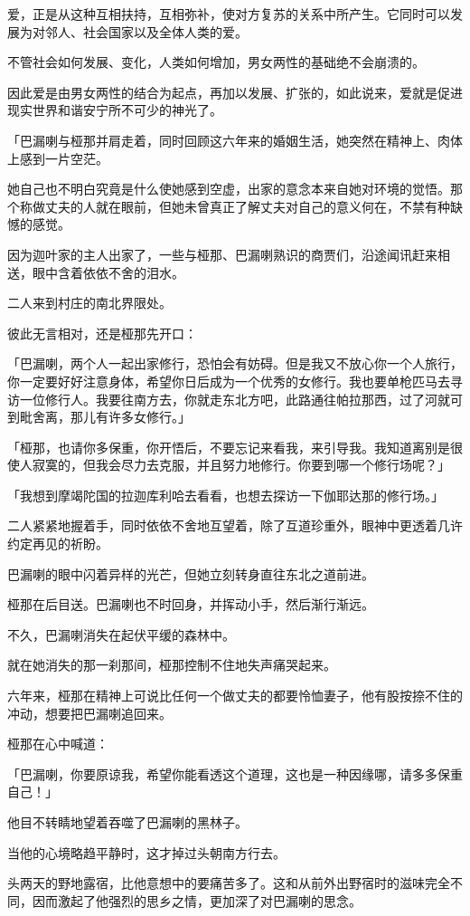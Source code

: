 \documentclass[twoside,openany]{book}
\begin{document}
爱，正是从这种互相扶持，互相弥补，使对方复苏的关系中所产生。它同时可以发展为对邻人、社会国家以及全体人类的爱。

不管社会如何发展、变化，人类如何增加，男女两性的基础绝不会崩溃的。

因此爱是由男女两性的结合为起点，再加以发展、扩张的，如此说来，爱就是促进现实世界和谐安宁所不可少的神光了。

「巴漏喇与桠那并肩走着，同时回顾这六年来的婚姻生活，她突然在精神上、肉体上感到一片空茫。

她自己也不明白究竟是什么使她感到空虚，出家的意念本来自她对环境的觉悟。那个称做丈夫的人就在眼前，但她未曾真正了解丈夫对自己的意义何在，不禁有种缺憾的感觉。

因为迦叶家的主人出家了，一些与桠那、巴漏喇熟识的商贾们，沿途闻讯赶来相送，眼中含着依依不舍的泪水。

二人来到村庄的南北界限处。

彼此无言相对，还是桠那先开口：

「巴漏喇，两个人一起出家修行，恐怕会有妨碍。但是我又不放心你一个人旅行，你一定要好好注意身体，希望你日后成为一个优秀的女修行。我也要单枪匹马去寻访一位修行人。我要往南方去，你就走东北方吧，此路通往帕拉那西，过了河就可到毗舍离，那儿有许多女修行。」

「桠那，也请你多保重，你开悟后，不要忘记来看我，来引导我。我知道离别是很使人寂寞的，但我会尽力去克服，并且努力地修行。你要到哪一个修行场呢？」

「我想到摩竭陀国的拉迦库利哈去看看，也想去探访一下伽耶达那的修行场。」

二人紧紧地握着手，同时依依不舍地互望着，除了互道珍重外，眼神中更透着几许约定再见的祈盼。

巴漏喇的眼中闪着异样的光芒，但她立刻转身直往东北之道前进。

桠那在后目送。巴漏喇也不时回身，并挥动小手，然后渐行渐远。

不久，巴漏喇消失在起伏平缓的森林中。

就在她消失的那一刹那间，桠那控制不住地失声痛哭起来。

六年来，桠那在精神上可说比任何一个做丈夫的都要怜恤妻子，他有股按捺不住的冲动，想要把巴漏喇追回来。

桠那在心中喊道：

「巴漏喇，你要原谅我，希望你能看透这个道理，这也是一种因缘哪，请多多保重自己！」

他目不转睛地望着吞噬了巴漏喇的黑林子。

当他的心境略趋平静时，这才掉过头朝南方行去。

头两天的野地露宿，比他意想中的要痛苦多了。这和从前外出野宿时的滋味完全不同，因而激起了他强烈的思乡之情，更加深了对巴漏喇的思念。
\end{document}
